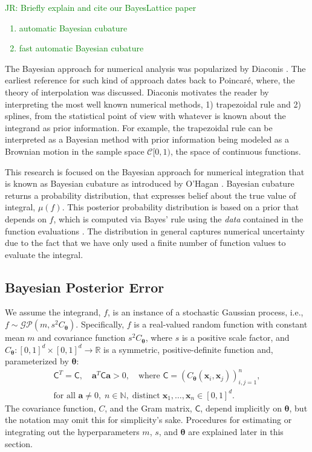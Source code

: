 \documentclass{svjour3}                     %
\newcommand{\bm}[1]{\boldsymbol{#1}}
\newcommand{\vtheta}{{\bm{\theta}}}
\newcommand{\va}{\bm{a}}
\newcommand{\vx}{\bm{x}}
\newcommand{\mC}{\mathsf{C}}
\newcommand{\JRNote}[1]{{\textcolor{green}{JR: #1}}}
\begin{document}
\JRNote{
Briefly explain and cite our BayesLattice paper
\begin{enumerate}
	\item automatic Bayesian cubature
	\item fast automatic Bayesian cubature
\end{enumerate}
}



The Bayesian approach for numerical analysis was popularized by Diaconis \cite{Dia88a}. The earliest reference for such kind of approach dates back to Poincar\'e, where, the theory of interpolation was discussed.
Diaconis motivates the reader by interpreting the most well known numerical methods, 1) trapezoidal rule and 2) splines, from the statistical point of view with whatever is known about the integrand as prior information. 
For example, the trapezoidal rule can be interpreted as a Bayesian method with prior information being modeled as a Brownian motion in the sample space $\mathcal{C}[0,1)$, the space of continuous functions. %

This research is focused on the Bayesian approach for numerical integration that is known as Bayesian cubature as introduced by O'Hagan \cite{OHagen1991}.  %
Bayesian cubature returns a probability distribution, that expresses belief about the true value of integral, $\mu(f)$.
This posterior probability distribution is based on a prior that depends on $f$, which is computed via Bayes' rule using the \emph{data} contained in the function evaluations \cite{BriEtal18a}. 
The distribution in general captures numerical uncertainty due to the fact that we have only used a finite number of function values to evaluate the integral.

\subsection{Bayesian Posterior Error}
\label{sec:BayesPostErr}

We assume the integrand, $f$, is an instance of a stochastic Gaussian process, i.e., $f \sim \mathcal{GP}(m,s^2 C_\vtheta)$.  Specifically, $f$ is a real-valued random function with constant mean $m$ and covariance function $s^2C_\vtheta$, where $s$ is a positive scale factor, and $C_\vtheta: [0,1]^d \times [0,1]^d \to \mathbb{R} $ is a symmetric, positive-definite function and, parameterized by $\vtheta$:
\begin{multline} \label{FJH:eq:CondPosDef}
\mC^T = \mC,  \quad \va^T \mC \va > 0, \quad \text{where }  \mC = \left(  C_\vtheta(\vx_i,\vx_j)  \right)_{i,j=1}^n,\\
\text{for all } \va \ne 0, \;
n\in \mathbb{N}, \; \text{distinct} \; \vx_1, \ldots, \vx_n \in [0,1]^d.
\end{multline}
The covariance function, $C$, and the Gram matrix, $\mC$, depend implicitly on $\vtheta$, but the notation may omit this for simplicity's sake.
Procedures for estimating or integrating out the hyperparameters $m$, $s$, and $\vtheta$ are explained later in this section.
\end{document}
